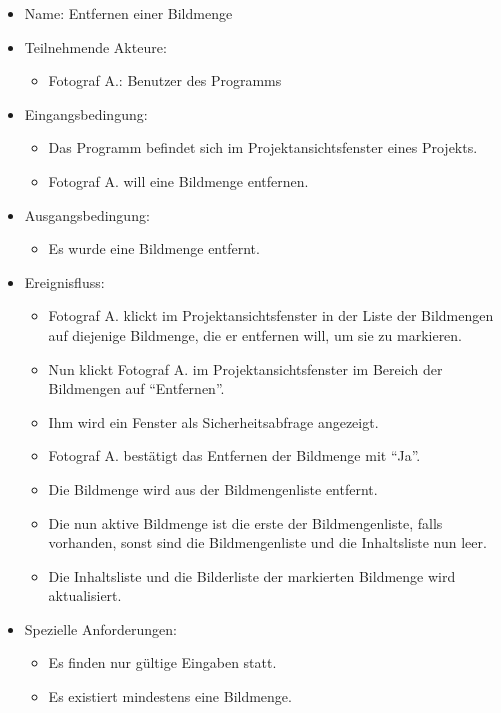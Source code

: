 	\begin{itemize}
		\item Name: Entfernen einer Bildmenge
		\item Teilnehmende Akteure:
		\begin{itemize}
			\item	Fotograf A.: Benutzer des Programms		
		\end{itemize}
		\item Eingangsbedingung:
		\begin{itemize}
			\item	Das Programm befindet sich im Projektansichtsfenster eines Projekts.
			\item Fotograf A. will eine Bildmenge entfernen.
		\end{itemize}
		\item Ausgangsbedingung:
		\begin{itemize}
			\item	Es wurde eine Bildmenge entfernt.	
		\end{itemize}
		\item Ereignisfluss:
		\begin{itemize}
			\item Fotograf A. klickt im Projektansichtsfenster in der Liste der Bildmengen auf diejenige Bildmenge, die er entfernen will, um sie zu markieren.		
			\item Nun klickt Fotograf A. im Projektansichtsfenster im Bereich der Bildmengen auf "`Entfernen"'.
			\item Ihm wird ein Fenster als Sicherheitsabfrage angezeigt.
			\item Fotograf A. bestätigt das Entfernen der Bildmenge mit "`Ja"'.
			\item Die Bildmenge wird aus der Bildmengenliste entfernt.
			\item Die nun aktive Bildmenge ist die erste der Bildmengenliste, falls vorhanden, sonst sind die Bildmengenliste und die Inhaltsliste nun leer.
			\item Die Inhaltsliste und die Bilderliste der markierten Bildmenge wird aktualisiert. 
		\end{itemize}
		\item Spezielle Anforderungen:
		\begin{itemize}
			\item	Es finden nur gültige Eingaben statt.
			\item Es existiert mindestens eine Bildmenge.
		\end{itemize}			
	\end{itemize}
	
